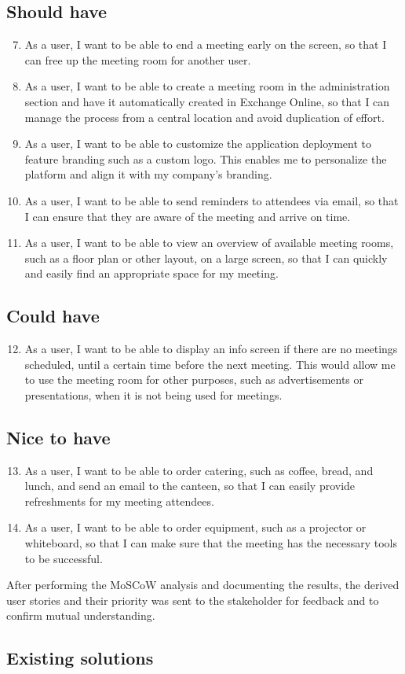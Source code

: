 \subsection*{Should have}
\begin{enumerate}
\setcounter{enumi}{6}
\item As a user, I want to be able to end a meeting early on the screen, so that I can free up the meeting room for another user.
\item As a user, I want to be able to create a meeting room in the administration section and have it automatically created in Exchange Online, so that I can manage the process from a central location and avoid duplication of effort.
\item As a user, I want to be able to customize the application deployment to feature branding such as a custom logo. This enables me to personalize the platform and align it with my company's branding.
\item As a user, I want to be able to send reminders to attendees via email, so that I can ensure that they are aware of the meeting and arrive on time.
\item As a user, I want to be able to view an overview of available meeting rooms, such as a floor plan or other layout, on a large screen, so that I can quickly and easily find an appropriate space for my meeting.
\end{enumerate}

\subsection*{Could have}
\begin{enumerate}
\setcounter{enumi}{11}
\item As a user, I want to be able to display an info screen if there are no meetings scheduled, until a certain time before the next meeting. This would allow me to use the meeting room for other purposes, such as advertisements or presentations, when it is not being used for meetings.
\end{enumerate}

\subsection*{Nice to have}
\begin{enumerate}
\setcounter{enumi}{12}
\item As a user, I want to be able to order catering, such as coffee, bread, and lunch, and send an email to the canteen, so that I can easily provide refreshments for my meeting attendees.
\item As a user, I want to be able to order equipment, such as a projector or whiteboard, so that I can make sure that the meeting has the necessary tools to be successful.
\end{enumerate}

After performing the MoSCoW analysis and documenting the results, the derived user stories and their priority was sent to the stakeholder for feedback and to confirm mutual understanding.







\subsection{Existing solutions}
